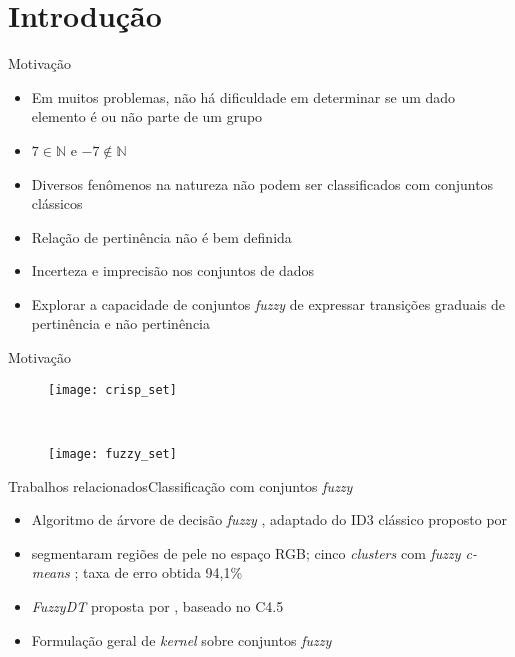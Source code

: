 \section{Introdução}

\begin{frame}{Motivação}
\begin{itemize}
    \item Em muitos problemas, não há dificuldade em determinar se um dado elemento é ou não parte de um grupo
    \item $7 \in \mathbb{N}$ e $-7 \notin \mathbb{N}$
    \item Diversos fenômenos na natureza não podem ser classificados com conjuntos clássicos
    \item Relação de pertinência não é bem definida \citep{pedrycz:98}
    \item Incerteza e imprecisão nos conjuntos de dados
    \item Explorar a capacidade de conjuntos \emph{fuzzy} de expressar transições graduais de pertinência e não pertinência
\end{itemize}
\end{frame}

\begin{frame}{Motivação}
\begin{figure}[h]
    \centering
    \begin{minipage}{0.48\textwidth}
        \texttt{[image: crisp\_set]}
    \end{minipage}
    ~ %
    \begin{minipage}{0.48\textwidth}
        \texttt{[image: fuzzy\_set]}
    \end{minipage}
\end{figure}
\end{frame}

\begin{frame}{Trabalhos relacionados}{Classificação com conjuntos \emph{fuzzy}}
\begin{itemize}
    \item Algoritmo de árvore de decisão \emph{fuzzy} \citep{umano:94}, adaptado do ID3 clássico proposto por \citet{quinlan:86}
    \item \citet{bhatt:09} segmentaram regiões de pele no espaço RGB; cinco \emph{clusters} com \emph{fuzzy c-means} \citep{bezdek:84}; taxa de erro obtida 94,1\%
    \item \emph{FuzzyDT} proposta por \citet{cintra:13}, baseado no C4.5 \citep{quinlan:93}
    \item Formulação geral de \emph{kernel} sobre conjuntos \emph{fuzzy} \citep{guevara:14}
\end{itemize}
\end{frame}

